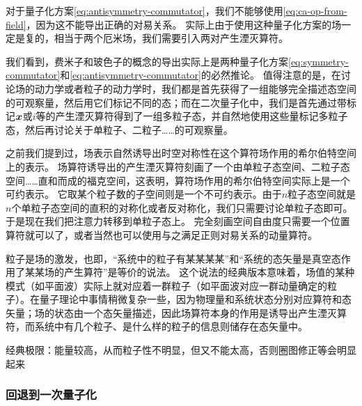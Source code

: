 \documentclass[UTF8, a4paper]{ctexart}
\begin{document}

对于量子化方案\eqref{eq:antisymmetry-commutator}，我们不能够使用\eqref{eq:ca-op-from-field}，因为这不能导出正确的对易关系。
实际上由于使用这种量子化方案的场一定是复的，相当于两个厄米场，我们需要引入两对产生湮灭算符。

我们看到，费米子和玻色子的概念的导出实际上是两种量子化方案\eqref{eq:symmetry-commutator}和\eqref{eq:antisymmetry-commutator}的必然推论。
值得注意的是，在讨论场的动力学或者粒子的动力学时，我们都是首先获得了一组能够完全描述态空间的可观察量，然后用它们标记不同的态；而在二次量子化中，我们是首先通过带标记$\vb*{x}$或$i$等的产生湮灭算符得到了一组多粒子态，并自然地使用这些量标记多粒子态，然后再讨论关于单粒子、二粒子……的可观察量。

之前我们提到过，场表示自然诱导出时空对称性在这个算符场作用的希尔伯特空间上的表示。
场算符诱导出的产生湮灭算符刻画了一个由单粒子态空间、二粒子态空间……直和而成的福克空间，这表明，算符场作用的希尔伯特空间实际上是一个可约表示。
它取某个粒子数的子空间则是一个不可约表示。由于$n$粒子态空间就是$n$个单粒子态空间的直积的对称化或者反对称化，我们只需要讨论单粒子态即可。于是现在我们把注意力转移到单粒子态上。
完全刻画空间自由度只需要一个位置算符就可以了，或者当然也可以使用与之满足正则对易关系的动量算符。



粒子是场的激发，也即，“系统中的粒子有某某某某”和“系统的态矢量是真空态作用了某某场的产生算符”是等价的说法。
这个说法的经典版本意味着，场值的某种模式（如平面波）实际上就对应着一群粒子（如平面波对应一群动量确定的粒子）。在量子理论中事情稍微复杂一些，因为物理量和系统状态分别对应算符和态矢量；场的状态由一个态矢量描述，因此场算符本身的作用是诱导出产生湮灭算符，而系统中有几个粒子、是什么样的粒子的信息则储存在态矢量中。

经典极限：能量较高，从而粒子性不明显，但又不能太高，否则圈图修正等会明显起来

\subsubsection{回退到一次量子化}
\end{document}
